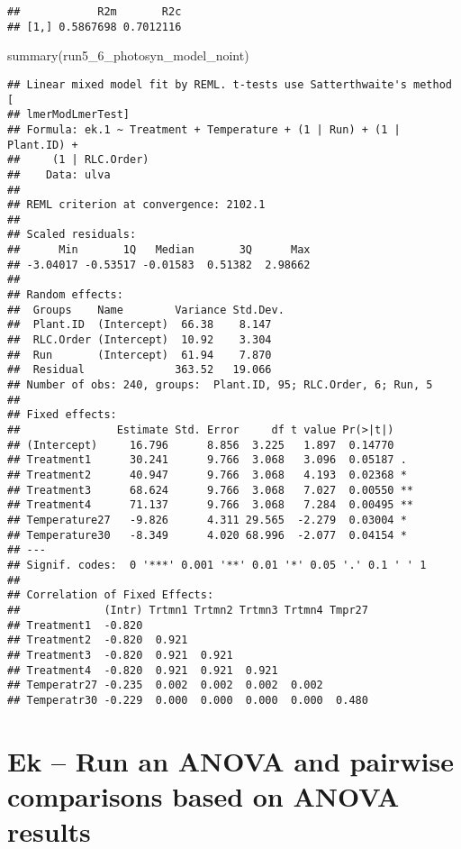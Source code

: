 \documentclass[
]{article}
\newenvironment{Shaded}{\begin{snugshade}}{\end{snugshade}}
\newcommand{\FunctionTok}[1]{\textcolor[rgb]{0.00,0.00,0.00}{#1}}
\newcommand{\NormalTok}[1]{#1}
\begin{document}
\begin{verbatim}
##            R2m       R2c
## [1,] 0.5867698 0.7012116
\end{verbatim}

\begin{Shaded}
\begin{Highlighting}[]
\FunctionTok{summary}\NormalTok{(run5\_6\_photosyn\_model\_noint)}
\end{Highlighting}
\end{Shaded}

\begin{verbatim}
## Linear mixed model fit by REML. t-tests use Satterthwaite's method [
## lmerModLmerTest]
## Formula: ek.1 ~ Treatment + Temperature + (1 | Run) + (1 | Plant.ID) +  
##     (1 | RLC.Order)
##    Data: ulva
## 
## REML criterion at convergence: 2102.1
## 
## Scaled residuals: 
##      Min       1Q   Median       3Q      Max 
## -3.04017 -0.53517 -0.01583  0.51382  2.98662 
## 
## Random effects:
##  Groups    Name        Variance Std.Dev.
##  Plant.ID  (Intercept)  66.38    8.147  
##  RLC.Order (Intercept)  10.92    3.304  
##  Run       (Intercept)  61.94    7.870  
##  Residual              363.52   19.066  
## Number of obs: 240, groups:  Plant.ID, 95; RLC.Order, 6; Run, 5
## 
## Fixed effects:
##               Estimate Std. Error     df t value Pr(>|t|)   
## (Intercept)     16.796      8.856  3.225   1.897  0.14770   
## Treatment1      30.241      9.766  3.068   3.096  0.05187 . 
## Treatment2      40.947      9.766  3.068   4.193  0.02368 * 
## Treatment3      68.624      9.766  3.068   7.027  0.00550 **
## Treatment4      71.137      9.766  3.068   7.284  0.00495 **
## Temperature27   -9.826      4.311 29.565  -2.279  0.03004 * 
## Temperature30   -8.349      4.020 68.996  -2.077  0.04154 * 
## ---
## Signif. codes:  0 '***' 0.001 '**' 0.01 '*' 0.05 '.' 0.1 ' ' 1
## 
## Correlation of Fixed Effects:
##             (Intr) Trtmn1 Trtmn2 Trtmn3 Trtmn4 Tmpr27
## Treatment1  -0.820                                   
## Treatment2  -0.820  0.921                            
## Treatment3  -0.820  0.921  0.921                     
## Treatment4  -0.820  0.921  0.921  0.921              
## Temperatr27 -0.235  0.002  0.002  0.002  0.002       
## Temperatr30 -0.229  0.000  0.000  0.000  0.000  0.480
\end{verbatim}

\hypertarget{ek-run-an-anova-and-pairwise-comparisons-based-on-anova-results}{%
\section{Ek -- Run an ANOVA and pairwise comparisons based on ANOVA
results}\label{ek-run-an-anova-and-pairwise-comparisons-based-on-anova-results}}
\end{document}
